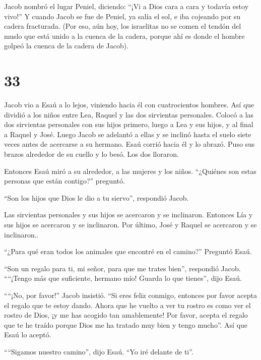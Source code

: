  Jacob nombró el lugar Peniel, diciendo: ``¡Vi a Dios cara
a cara y todavía estoy vivo!''  Y cuando Jacob se fue de
Peniel, ya salía el sol, e iba cojeando por su cadera fracturada.
 (Por eso, aún hoy, los israelitas no se comen el tendón
del muslo que está unido a la cuenca de la cadera, porque ahí es donde
el hombre golpeó la cuenca de la cadera de Jacob).

\hypertarget{section-32}{%
\section{33}\label{section-32}}

 Jacob vio a Esaú a lo lejos, viniendo hacia él con
cuatrocientos hombres. Así que dividió a los niños entre Lea, Raquel y
las dos sirvientas personales.  Colocó a las dos sirvientas
personales con sus hijos primero, luego a Lea y sus hijos, y al final a
Raquel y José.  Luego Jacob se adelantó a ellas y se inclinó
hasta el suelo siete veces antes de acercarse a su hermano. 
Esaú corrió hacia él y lo abrazó. Puso sus brazos alrededor de su cuello
y lo besó. Los dos lloraron.

 Entonces Esaú miró a su alrededor, a las mujeres y los
niños. ``¿Quiénes son estas personas que están contigo?'' preguntó.

``Son los hijos que Dios le dio a tu siervo'', respondió Jacob.

 Las sirvientas personales y sus hijos se acercaron y se
inclinaron.  Entonces Lía y sus hijos se acercaron y se
inclinaron. Por último, José y Raquel se acercaron y se inclinaron..

 ``¿Para qué eran todos los animales que encontré en el
camino?'' Preguntó Esaú.

``Son un regalo para ti, mi señor, para que me trates bien'', respondió
Jacob.  ````¡Tengo más que suficiente, hermano mío! Guarda
lo que tienes'', dijo Esaú.

 ````¡No, por favor!'' Jacob insistió. ``Si eres feliz
conmigo, entonces por favor acepta el regalo que te estoy dando. Ahora
que he vuelto a ver tu rostro es como ver el rostro de Dios, ¡y me has
acogido tan amablemente!  Por favor, acepta el regalo que
te he traído porque Dios me ha tratado muy bien y tengo mucho''. Así que
Esaú lo aceptó.

 ````Sigamos nuestro camino'', dijo Esaú. ``Yo iré delante
de ti''.

